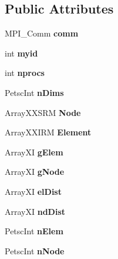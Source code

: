 \subsection*{Public Attributes}
\begin{DoxyCompactItemize}
\item 
\mbox{\label{class_mesh_ae30b0028e49c22ae7a6fff0a89db7394}} 
M\+P\+I\+\_\+\+Comm {\bfseries comm}
\item 
\mbox{\label{class_mesh_ab4d9d2c7e02931d2d803da95516eaa20}} 
int {\bfseries myid}
\item 
\mbox{\label{class_mesh_a8a2f6f435dc9166168d2cda553d833e7}} 
int {\bfseries nprocs}
\item 
\mbox{\label{class_mesh_ab7f1c680291e263a5b83eec2796b9923}} 
Petsc\+Int {\bfseries n\+Dims}
\item 
\mbox{\label{class_mesh_a1160f45b158032295a5dde423d3b782a}} 
Array\+X\+X\+S\+RM {\bfseries Node}
\item 
\mbox{\label{class_mesh_ad4f5557e8d2104647a235669f8df09cd}} 
Array\+X\+X\+I\+RM {\bfseries Element}
\item 
\mbox{\label{class_mesh_ae9d1873e57dc7cb666329946c29bbd1b}} 
Array\+XI {\bfseries g\+Elem}
\item 
\mbox{\label{class_mesh_a11aa956306c304ccfa37572de291c705}} 
Array\+XI {\bfseries g\+Node}
\item 
\mbox{\label{class_mesh_a1d49421b1ab9aadd6ff11a9caf8de819}} 
Array\+XI {\bfseries el\+Dist}
\item 
\mbox{\label{class_mesh_a6ce034f24bd0d73310649991f5374d13}} 
Array\+XI {\bfseries nd\+Dist}
\item 
\mbox{\label{class_mesh_ae1ba84601920b113eba2f99adbaca2d4}} 
Petsc\+Int {\bfseries n\+Elem}
\item 
\mbox{\label{class_mesh_a2e5ff5315bd999af1361e6afe7a78ed6}} 
Petsc\+Int {\bfseries n\+Node}

\end{DoxyCompactItemize}
